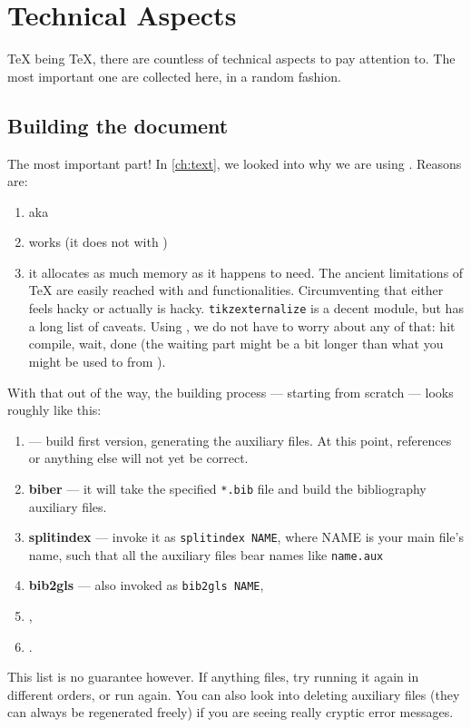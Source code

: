 \chapter{Technical Aspects}
\TeX{} being \TeX{}, there are countless of technical aspects to pay attention to.
The most important one are collected here, in a random fashion.

\section{Building the document}
The most important part!
In \cref{ch:text}, we looked into why we are using .
Reasons are:
\begin{enumerate}
	\item {} aka 
	\item {} works (it does not with )
	\item it allocates as much memory as it happens to need.
	The ancient limitations of \TeX{} are easily reached with  and  functionalities.
	Circumventing that either feels hacky or actually is hacky.
	\texttt{tikzexternalize} is a decent module, but has a long list of caveats.
	Using , we do not have to worry about any of that: hit compile, wait, done (the waiting part might be a bit longer than what you might be used to from ).
\end{enumerate}

With that out of the way, the building process --- starting from scratch --- looks roughly like this:
\begin{enumerate}
	\item \textbf{} --- build first version, generating the auxiliary files.
	At this point, references or anything else will not yet be correct.
	\item \textbf{biber} --- it will take the specified \texttt{*.bib} file and build the bibliography auxiliary files.
	\item \textbf{splitindex} --- invoke it as \texttt{splitindex NAME}, where NAME is your main file's name, such that all the auxiliary files bear names like \texttt{name.aux} 
	\item \textbf{bib2gls} --- also invoked as  \texttt{bib2gls NAME},
	\item \textbf{},
	\item \textbf{}.
\end{enumerate}
This list is no guarantee however.
If anything files, try running it again in different orders, or run  again.
You can also look into deleting auxiliary files (they can always be regenerated freely) if you are seeing really cryptic error messages.

